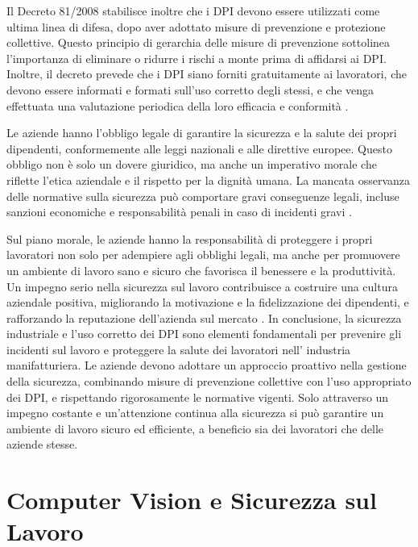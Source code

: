 Il Decreto 81/2008 stabilisce inoltre che i DPI devono essere utilizzati come ultima linea di difesa, dopo aver adottato misure di prevenzione e protezione collettive. Questo principio di gerarchia delle misure di prevenzione sottolinea l'importanza di eliminare o ridurre i rischi a monte prima di affidarsi ai DPI. Inoltre, il decreto prevede che i DPI siano forniti gratuitamente ai lavoratori, che devono essere informati e formati sull'uso corretto degli stessi, e che venga effettuata una valutazione periodica della loro efficacia e conformità \cite{decreto81}.

Le aziende hanno l'obbligo legale di garantire la sicurezza e la salute dei propri dipendenti, conformemente alle leggi nazionali e alle direttive europee. Questo obbligo non è solo un dovere giuridico, ma anche un imperativo morale che riflette l'etica aziendale e il rispetto per la dignità umana. La mancata osservanza delle normative sulla sicurezza può comportare gravi conseguenze legali, incluse sanzioni economiche e responsabilità penali in caso di incidenti gravi \cite{decreto81}.

Sul piano morale, le aziende hanno la responsabilità di proteggere i propri lavoratori non solo per adempiere agli obblighi legali, ma anche per promuovere un ambiente di lavoro sano e sicuro che favorisca il benessere e la produttività. Un impegno serio nella sicurezza sul lavoro contribuisce a costruire una cultura aziendale positiva, migliorando la motivazione e la fidelizzazione dei dipendenti, e rafforzando la reputazione dell'azienda sul mercato \cite{valoresicurezza}.
In conclusione, la sicurezza industriale e l'uso corretto dei DPI sono elementi fondamentali per prevenire gli incidenti sul lavoro e proteggere la salute dei lavoratori nell' industria manifatturiera. Le aziende devono adottare un approccio proattivo nella gestione della sicurezza, combinando misure di prevenzione collettive con l'uso appropriato dei DPI, e rispettando rigorosamente le normative vigenti. Solo attraverso un impegno costante e un'attenzione continua alla sicurezza si può garantire un ambiente di lavoro sicuro ed efficiente, a beneficio sia dei lavoratori che delle aziende stesse.


\section{Computer Vision e Sicurezza sul Lavoro}

